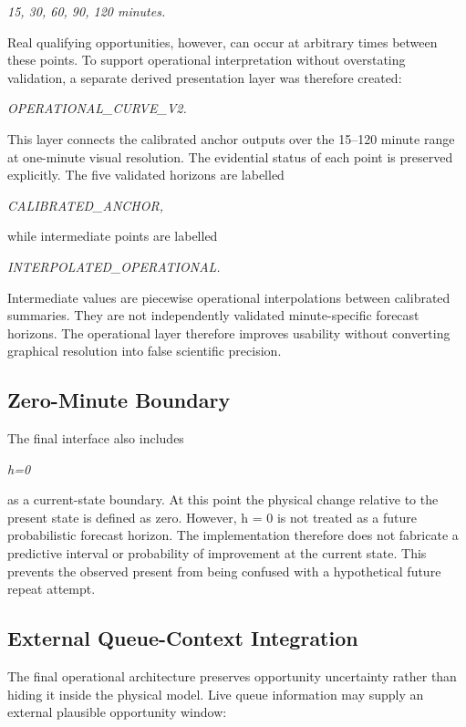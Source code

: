 \begin{center}\textit{15, 30, 60, 90, 120 minutes.}\end{center}

Real qualifying opportunities, however, can occur at arbitrary times between these points. To support operational interpretation without overstating validation, a separate derived presentation layer was therefore created:

\begin{center}\textit{OPERATIONAL\_CURVE\_V2.}\end{center}

This layer connects the calibrated anchor outputs over the 15--120 minute range at one-minute visual resolution. The evidential status of each point is preserved explicitly. The five validated horizons are labelled

\begin{center}\textit{CALIBRATED\_ANCHOR,}\end{center}

while intermediate points are labelled

\begin{center}\textit{INTERPOLATED\_OPERATIONAL.}\end{center}

Intermediate values are piecewise operational interpolations between calibrated summaries. They are not independently validated minute-specific forecast horizons. The operational layer therefore improves usability without converting graphical resolution into false scientific precision.

\subsection{Zero-Minute Boundary}
The final interface also includes

\begin{center}\textit{h=0}\end{center}

as a current-state boundary. At this point the physical change relative to the present state is defined as zero. However, h = 0 is not treated as a future probabilistic forecast horizon. The implementation therefore does not fabricate a predictive interval or probability of improvement at the current state. This prevents the observed present from being confused with a hypothetical future repeat attempt.

\subsection{External Queue-Context Integration}
The final operational architecture preserves opportunity uncertainty rather than hiding it inside the physical model. Live queue information may supply an external plausible opportunity window:


